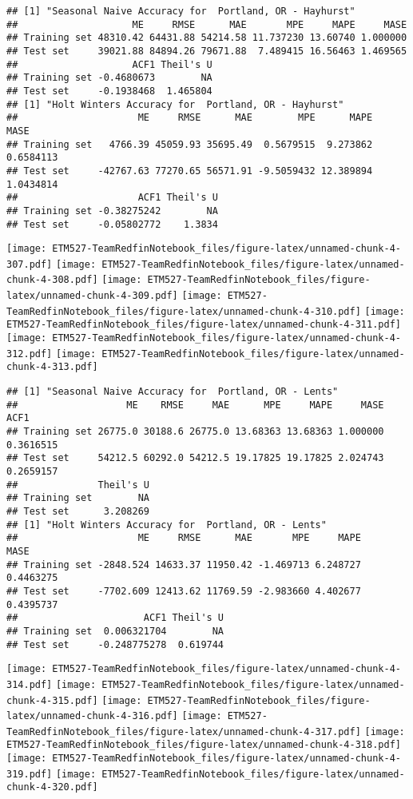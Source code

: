 \documentclass[]{article}
\begin{document}
\begin{verbatim}
## [1] "Seasonal Naive Accuracy for  Portland, OR - Hayhurst"
##                    ME     RMSE      MAE       MPE     MAPE     MASE
## Training set 48310.42 64431.88 54214.58 11.737230 13.60740 1.000000
## Test set     39021.88 84894.26 79671.88  7.489415 16.56463 1.469565
##                    ACF1 Theil's U
## Training set -0.4680673        NA
## Test set     -0.1938468  1.465804
## [1] "Holt Winters Accuracy for  Portland, OR - Hayhurst"
##                     ME     RMSE      MAE        MPE      MAPE      MASE
## Training set   4766.39 45059.93 35695.49  0.5679515  9.273862 0.6584113
## Test set     -42767.63 77270.65 56571.91 -9.5059432 12.389894 1.0434814
##                     ACF1 Theil's U
## Training set -0.38275242        NA
## Test set     -0.05802772    1.3834
\end{verbatim}

\texttt{[image: ETM527-TeamRedfinNotebook\_files/figure-latex/unnamed-chunk-4-307.pdf]}
\texttt{[image: ETM527-TeamRedfinNotebook\_files/figure-latex/unnamed-chunk-4-308.pdf]}
\texttt{[image: ETM527-TeamRedfinNotebook\_files/figure-latex/unnamed-chunk-4-309.pdf]}
\texttt{[image: ETM527-TeamRedfinNotebook\_files/figure-latex/unnamed-chunk-4-310.pdf]}
\texttt{[image: ETM527-TeamRedfinNotebook\_files/figure-latex/unnamed-chunk-4-311.pdf]}
\texttt{[image: ETM527-TeamRedfinNotebook\_files/figure-latex/unnamed-chunk-4-312.pdf]}
\texttt{[image: ETM527-TeamRedfinNotebook\_files/figure-latex/unnamed-chunk-4-313.pdf]}

\begin{verbatim}
## [1] "Seasonal Naive Accuracy for  Portland, OR - Lents"
##                   ME    RMSE     MAE      MPE     MAPE     MASE      ACF1
## Training set 26775.0 30188.6 26775.0 13.68363 13.68363 1.000000 0.3616515
## Test set     54212.5 60292.0 54212.5 19.17825 19.17825 2.024743 0.2659157
##              Theil's U
## Training set        NA
## Test set      3.208269
## [1] "Holt Winters Accuracy for  Portland, OR - Lents"
##                     ME     RMSE      MAE       MPE     MAPE      MASE
## Training set -2848.524 14633.37 11950.42 -1.469713 6.248727 0.4463275
## Test set     -7702.609 12413.62 11769.59 -2.983660 4.402677 0.4395737
##                      ACF1 Theil's U
## Training set  0.006321704        NA
## Test set     -0.248775278  0.619744
\end{verbatim}

\texttt{[image: ETM527-TeamRedfinNotebook\_files/figure-latex/unnamed-chunk-4-314.pdf]}
\texttt{[image: ETM527-TeamRedfinNotebook\_files/figure-latex/unnamed-chunk-4-315.pdf]}
\texttt{[image: ETM527-TeamRedfinNotebook\_files/figure-latex/unnamed-chunk-4-316.pdf]}
\texttt{[image: ETM527-TeamRedfinNotebook\_files/figure-latex/unnamed-chunk-4-317.pdf]}
\texttt{[image: ETM527-TeamRedfinNotebook\_files/figure-latex/unnamed-chunk-4-318.pdf]}
\texttt{[image: ETM527-TeamRedfinNotebook\_files/figure-latex/unnamed-chunk-4-319.pdf]}
\texttt{[image: ETM527-TeamRedfinNotebook\_files/figure-latex/unnamed-chunk-4-320.pdf]}
\end{document}
